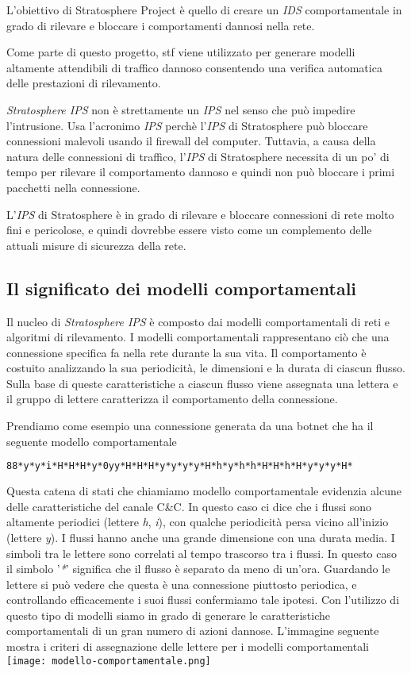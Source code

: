 \documentclass[../main.tex]{subfiles}
\begin{document}
L'obiettivo di Stratosphere Project è quello di creare un \textit{IDS} comportamentale in grado di rilevare e bloccare i comportamenti dannosi nella rete.

Come parte di questo progetto, stf viene utilizzato per generare modelli altamente attendibili di traffico dannoso consentendo una verifica automatica delle prestazioni di rilevamento. \newline

\textit{Stratosphere IPS} non è strettamente un \textit{IPS} nel senso che può impedire l'intrusione. Usa l'acronimo \textit{IPS} perchè l'\textit{IPS} di Stratosphere può bloccare connessioni malevoli usando il firewall del computer. Tuttavia, a causa della natura delle connessioni di traffico, l'\textit{IPS} di Stratosphere necessita di un po' di tempo per rilevare il comportamento dannoso e quindi non può bloccare i primi pacchetti nella connessione.

L'\textit{IPS} di Stratosphere è in grado di rilevare e bloccare connessioni di rete molto fini e pericolose, e quindi dovrebbe essere visto come un complemento delle attuali misure di sicurezza della rete.

\subsection{Il significato dei modelli comportamentali} 
Il nucleo di \textit{Stratosphere IPS} è composto dai modelli comportamentali di reti e algoritmi di rilevamento. I modelli comportamentali rappresentano ciò che una connessione specifica fa nella rete durante la sua vita. Il comportamento è costuito analizzando la sua periodicità, le dimensioni e la durata di ciascun flusso. Sulla base di queste caratteristiche a ciascun flusso viene assegnata una lettera e il gruppo di lettere caratterizza il comportamento della connessione.

Prendiamo come esempio una connessione generata da una botnet che ha il seguente modello comportamentale
\begin{lstlisting}[language=bash]
88*y*y*i*H*H*H*y*0yy*H*H*H*y*y*y*y*H*h*y*h*h*H*H*h*H*y*y*y*H*
\end{lstlisting}

Questa catena di stati che chiamiamo modello comportamentale evidenzia alcune delle caratteristiche del canale C\&C. In questo caso ci dice che i flussi sono altamente periodici (lettere \textit{h}, \textit{i}), con qualche periodicità persa vicino all'inizio (lettere \textit{y}). I flussi hanno anche una grande dimensione con una durata media. I simboli tra le lettere sono correlati al tempo trascorso tra i flussi. In questo caso il simbolo '\textit{*}' significa che il flusso è separato da meno di un'ora. Guardando le lettere si può vedere che questa è una connessione piuttosto periodica, e controllando efficacemente i suoi flussi confermiamo tale ipotesi.
Con l'utilizzo di questo tipo di modelli siamo in grado di generare le caratteristiche comportamentali di un gran numero di azioni dannose. L'immagine seguente mostra i criteri di assegnazione delle lettere per i modelli comportamentali \newline
\texttt{[image: modello-comportamentale.png]}
\end{document}
